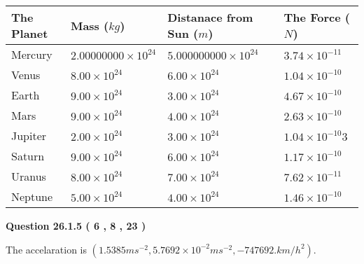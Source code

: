 \documentclass[12pt]{article}
\begin{document}
 
\begin{tabular}{|l|l|l|l|}
\hline
The Planet & Mass ($kg$) & Distanace from Sun ($m$) & The Force ($N$)\\
\hline
Mercury  &
           $ %
2.00000000 \times 10^{24}  $   &
             $ %
5.000000000 \times 10^{24}$    & $ %
3.74 \times 10^{-11} $
\\  \hline
Venus    &
           $  %
8.00 \times 10^{24}  $     &
             $ %
6.00 \times 10^{24} $    & $ %
1.04 \times 10^{-10} $
\\  \hline
Earth    &
           $  %
9.00 \times 10^{24}$     &
             $ %
3.00 \times 10^{24} $    & $ %
4.67 \times 10^{-10} $
\\   \hline
Mars     &
           $  %
9.00 \times 10^{24} $     &
             $ %
4.00 \times 10^{24}$    & $ %
2.63 \times 10^{-10} $
\\   \hline
Jupiter  &
           $  %
2.00 \times 10^{24}  $    &
             $ %
3.00 \times 10^{24} $    & $ %
1.04 \times 10^{-10}3 $
\\  \hline
Saturn   &
           $  %
9.00 \times 10^{24}   $    &
             $ %
6.00 \times 10^{24}  $    & $ %
1.17 \times 10^{-10} $
\\  \hline
Uranus   &
           $  %
8.00 \times 10^{24} $    &
             $ %
7.00 \times 10^{24}$    & $ %
7.62 \times 10^{-11} $
\\  \hline
Neptune  &
           $  %
5.00 \times 10^{24}  $    &
             $ %
4.00 \times 10^{24} $    & $ %
1.46 \times 10^{-10} $
\\  \hline
 
\end{tabular}
 
 
 
 
  
\vspace{0.2in}
  
{\textbf{\Large{Question
26.1.5 
 (           6 ,           8 ,          23 )
}}}
  
  
 
 
\noindent{}
 
 
The accelaration is
$(
1.5385ms^{-2},
5.7692 \times 10^{-2}ms^{-2},
-747692.km/h^2
).
$
 
 
 
 
  
\vspace{0.2in}
  
\end{document}
